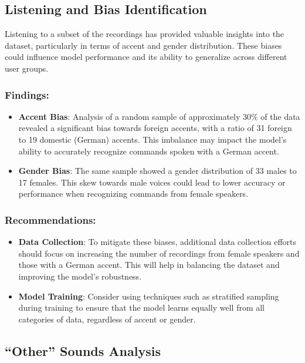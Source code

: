 \subsection{Listening and Bias Identification}

Listening to a subset of the recordings has provided valuable insights into the dataset, particularly in terms of accent and gender distribution. These biases could influence model performance and its ability to generalize across different user groups.

\subsubsection{Findings:}

\begin{itemize}
    \item \textbf{Accent Bias}: Analysis of a random sample of approximately 30\% of the data revealed a significant bias towards foreign accents, with a ratio of 31 foreign to 19 domestic (German) accents. This imbalance may impact the model’s ability to accurately recognize commands spoken with a German accent.
    \item \textbf{Gender Bias}: The same sample showed a gender distribution of 33 males to 17 females. This skew towards male voices could lead to lower accuracy or performance when recognizing commands from female speakers.
\end{itemize}

\subsubsection{Recommendations:}

\begin{itemize}
    \item \textbf{Data Collection}: To mitigate these biases, additional data collection efforts should focus on increasing the number of recordings from female speakers and those with a German accent. This will help in balancing the dataset and improving the model's robustness.
    \item \textbf{Model Training}: Consider using techniques such as stratified sampling during training to ensure that the model learns equally well from all categories of data, regardless of accent or gender.
\end{itemize}

\subsection{``Other'' Sounds Analysis}

